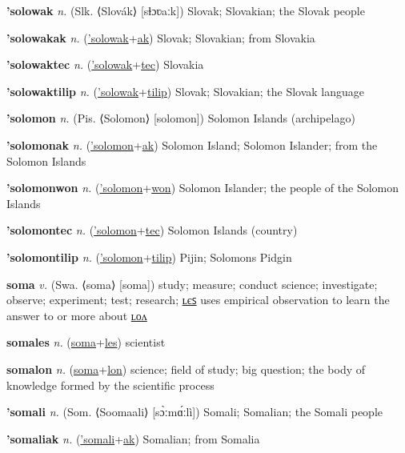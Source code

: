 \textbf{\hypertarget{'solowak}{'solowak}} \textit{n.} (Slk. ⟨Slovák⟩ [sɫɔʋaːk])
Slovak; Slovakian; the Slovak people

\textbf{\hypertarget{'solowakak}{'solowakak}} \textit{n.} (\hyperlink{'solowak}{'solowak}+\allowbreak \hyperlink{ak}{ak})
Slovak; Slovakian; from Slovakia

\textbf{\hypertarget{'solowaktec}{'solowaktec}} \textit{n.} (\hyperlink{'solowak}{'solowak}+\allowbreak \hyperlink{tec}{tec})
Slovakia

\textbf{\hypertarget{'solowaktilip}{'solowaktilip}} \textit{n.} (\hyperlink{'solowak}{'solowak}+\allowbreak \hyperlink{tilip}{tilip})
Slovak; Slovakian; the Slovak language

\textbf{\hypertarget{'solomon}{'solomon}} \textit{n.} (Pis. ⟨Solomon⟩ [solomon])
Solomon Islands (archipelago)

\textbf{\hypertarget{'solomonak}{'solomonak}} \textit{n.} (\hyperlink{'solomon}{'solomon}+\allowbreak \hyperlink{ak}{ak})
Solomon Island; Solomon Islander; from the Solomon Islands

\textbf{\hypertarget{'solomonwon}{'solomonwon}} \textit{n.} (\hyperlink{'solomon}{'solomon}+\allowbreak \hyperlink{won}{won})
Solomon Islander; the people of the Solomon Islands

\textbf{\hypertarget{'solomontec}{'solomontec}} \textit{n.} (\hyperlink{'solomon}{'solomon}+\allowbreak \hyperlink{tec}{tec})
Solomon Islands (country)

\textbf{\hypertarget{'solomontilip}{'solomontilip}} \textit{n.} (\hyperlink{'solomon}{'solomon}+\allowbreak \hyperlink{tilip}{tilip})
Pijin; Solomons Pidgin

\textbf{\hypertarget{soma}{soma}} \textit{v.} (Swa. ⟨soma⟩ [soma])
study; measure; conduct science; investigate; observe; experiment; test; research; \hyperlink{somales}{ʟєꜱ} uses empirical observation to learn the answer to or more about \hyperlink{somalon}{ʟᴏᴧ}

\textbf{\hypertarget{somales}{somales}} \textit{n.} (\hyperlink{soma}{soma}+\allowbreak \hyperlink{les}{les})
scientist

\textbf{\hypertarget{somalon}{somalon}} \textit{n.} (\hyperlink{soma}{soma}+\allowbreak \hyperlink{lon}{lon})
science; field of study; big question; the body of knowledge formed by the scientific process

\textbf{\hypertarget{'somali}{'somali}} \textit{n.} (Som. ⟨Soomaali⟩ [sɔ̀ːmɑ́ːlì])
Somali; Somalian; the Somali people

\textbf{\hypertarget{'somaliak}{'somaliak}} \textit{n.} (\hyperlink{'somali}{'somali}+\allowbreak \hyperlink{ak}{ak})
Somalian; from Somalia

